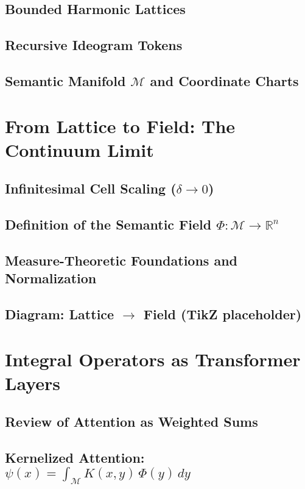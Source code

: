 \documentclass[11pt]{article}
\newcommand{\Manifold}{\mathcal{M}}
\newcommand{\Field}{\Phi}
\newcommand{\Kernel}{K}
\begin{document}
\subsection{Bounded Harmonic Lattices}
\subsection{Recursive Ideogram Tokens}
\subsection{Semantic Manifold $\Manifold$ and Coordinate Charts}

\section{From Lattice to Field: The Continuum Limit}
\subsection{Infinitesimal Cell Scaling ($\delta \to 0$)}
\subsection{Definition of the Semantic Field $\Field : \Manifold \to \mathbb{R}^n$}
\subsection{Measure-Theoretic Foundations and Normalization}
\subsection{Diagram: Lattice $\rightarrow$ Field (TikZ placeholder)}

\section{Integral Operators as Transformer Layers}
\subsection{Review of Attention as Weighted Sums}
\subsection{Kernelized Attention: $\displaystyle \psi(x)=\int_{\Manifold}\Kernel(x,y)\,\Field(y)\,dy$}
\end{document}
